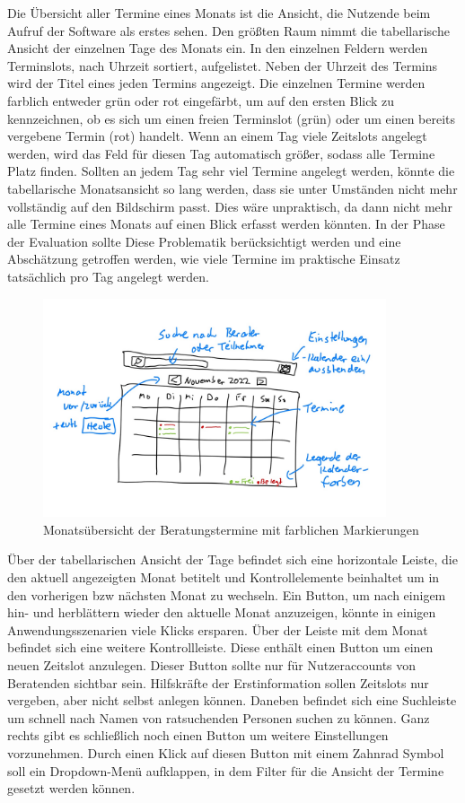 \documentclass[12pt]{article}
\begin{document}
Die Übersicht aller Termine eines Monats ist die Ansicht, die Nutzende beim
Aufruf der Software als erstes sehen. Den größten Raum nimmt die tabellarische
Ansicht der einzelnen Tage des Monats ein. In den einzelnen Feldern werden
Terminslots, nach Uhrzeit sortiert, aufgelistet. Neben der Uhrzeit des Termins
wird der Titel eines jeden Termins angezeigt. Die einzelnen Termine werden
farblich entweder grün oder rot eingefärbt, um auf den ersten Blick zu
kennzeichnen, ob es sich um einen freien Terminslot (grün) oder um einen
bereits vergebene Termin (rot) handelt. Wenn an einem Tag viele Zeitslots
angelegt werden, wird das Feld für diesen Tag automatisch größer, sodass alle
Termine Platz finden. Sollten an jedem Tag sehr viel Termine angelegt werden,
könnte die tabellarische Monatsansicht so lang werden, dass sie unter Umständen
nicht mehr vollständig auf den Bildschirm passt. Dies wäre unpraktisch, da dann
nicht mehr alle Termine eines Monats auf einen Blick erfasst werden könnten. In
der Phase der Evaluation sollte Diese Problematik berücksichtigt werden und
eine Abschätzung getroffen werden, wie viele Termine im praktische Einsatz
tatsächlich pro Tag angelegt werden.

\begin{figure}[h]
    \caption{Monatsübersicht der Beratungstermine mit farblichen Markierungen}
    \centering
    \includegraphics[width=0.9\textwidth]{doodle_month_view.jpeg}
\end{figure}

Über der tabellarischen Ansicht der Tage befindet sich eine horizontale Leiste, die den aktuell angezeigten Monat betitelt und Kontrollelemente beinhaltet um in den vorherigen bzw nächsten Monat zu wechseln. Ein Button, um nach einigem hin- und herblättern wieder den aktuelle Monat anzuzeigen, könnte in einigen Anwendungsszenarien viele Klicks ersparen. Über der Leiste mit dem Monat befindet sich eine weitere Kontrollleiste. Diese enthält einen Button um einen neuen Zeitslot anzulegen. Dieser Button sollte nur für Nutzeraccounts von Beratenden sichtbar sein. Hilfskräfte der Erstinformation sollen Zeitslots nur vergeben, aber nicht selbst anlegen können. Daneben befindet sich eine Suchleiste um schnell nach Namen von ratsuchenden Personen suchen zu können. Ganz rechts gibt es schließlich noch einen Button um weitere Einstellungen vorzunehmen. Durch einen Klick auf diesen Button mit einem Zahnrad Symbol soll ein Dropdown-Menü aufklappen, in dem Filter für die Ansicht der Termine gesetzt werden können.
\end{document}
